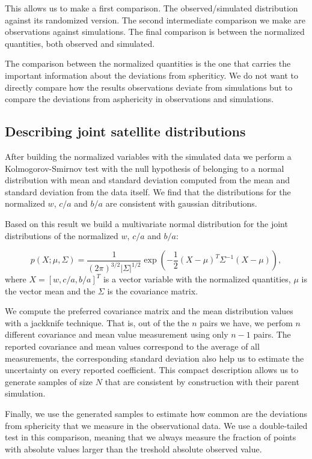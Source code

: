 \documentclass[a4paper,fleqn,usenatbib]{mnras}
\begin{document}
This allows us to make a first comparison. 
The observed/simulated
distribution against its randomized version. 
The second intermediate comparison we make are observations against
simulations.
The final comparison is between the normalized quantities, both
observed and simulated.

The comparison between the normalized quantities is the one that
carries the important information about the deviations from
spheriticy. 
We do not want to directly compare how the results observations
deviate from simulations but to compare the deviations from
asphericity in observations and simulations. 


\subsection{Describing joint satellite distributions}

After building the normalized variables with the simulated data we
perform  a Kolmogorov-Smirnov test with the null hypothesis of belonging
to a normal distribution with mean and standard deviation computed
from the mean and standard deviation from the data itself. 
We find that the distributions for the normalized $w$, $c/a$ and $b/a$
are consistent with gaussian ditributions.


Based on this result we build a multivariate normal distribution for
the joint distributions of the normalized $w$, $c/a$ and $b/a$:

\begin{equation}
p(X; \mu, \Sigma) = \frac{1}{(2\pi)^{3/2}|\Sigma|^{1/2}} \exp\left(-\frac{1}{2}(X-\mu)^{T}\Sigma^{-1}(X-\mu)\right), 
\end{equation}
% 
where $X=[w, c/a, b/a]^{T}$ is a vector variable with the normalized
quantities, $\mu$ is the vector mean and the $\Sigma$ is the
covariance matrix.  

We compute the preferred covariance matrix and the mean distribution values
with a jackknife technique. 
That is, out of the the $n$ pairs we have, we perfom $n$ different
covariance and mean value measurement using only $n-1$ pairs. 
The reported covariance and mean values correspond to the average of
all measurements, the corresponding standard deviation also help us to
estimate the uncertainty on every reported coefficient.
This compact description allows us to generate samples of size $N$
that are consistent by construction with their parent simulation. 

Finally, we use the generated samples to estimate how
common are the deviations from sphericity that we measure in the
observational data.  
We use a double-tailed test in this comparison, meaning that we
always measure the fraction of points with absolute values larger than the
treshold absolute observed value. 
\end{document}
